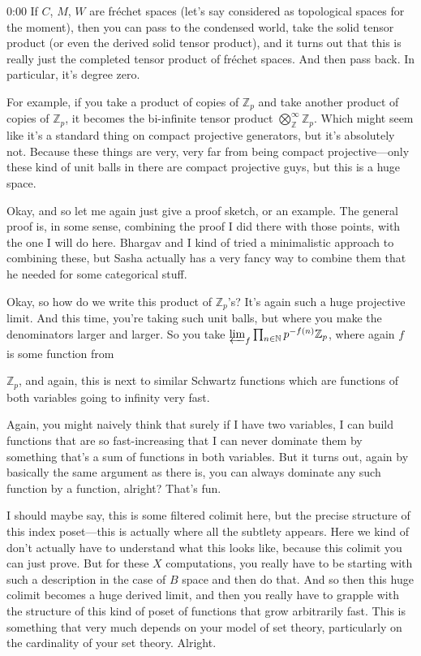\begin{unfinished}{0:00}
If $C$, $M$, $W$ are fréchet spaces (let's say considered as topological spaces for the moment), then you can pass to the condensed world, take the solid tensor product (or even the derived solid tensor product), and it turns out that this is really just the completed tensor product of fréchet spaces. And then pass back. In particular, it's degree zero.

For example, if you take a product of copies of $\mathbb{Z}_p$ and take another product of copies of $\mathbb{Z}_p$, it becomes the bi-infinite tensor product $\bigotimes_{\mathbb{Z}}^{\infty} \mathbb{Z}_p$. Which might seem like it's a standard thing on compact projective generators, but it's absolutely not. Because these things are very, very far from being compact projective---only these kind of unit balls in there are compact projective guys, but this is a huge space.

Okay, and so let me again just give a proof sketch, or an example. The general proof is, in some sense, combining the proof I did there with those points, with the one I will do here. Bhargav and I kind of tried a minimalistic approach to combining these, but Sasha actually has a very fancy way to combine them that he needed for some categorical stuff.

Okay, so how do we write this product of $\mathbb{Z}_p$'s? It's again such a huge projective limit. And this time, you're taking such unit balls, but where you make the denominators larger and larger. So you take $\varprojlim_f \prod_{n \in \mathbb{N}} p^{-f(n)} \mathbb{Z}_p$, where again $f$ is some function from 

$\mathbb{Z}_p$, and again, this is next to similar Schwartz functions which are functions of both variables going to infinity very fast.

Again, you might naively think that surely if I have two variables, I can build functions that are so fast-increasing that I can never dominate them by something that's a sum of functions in both variables. But it turns out, again by basically the same argument as there is, you can always dominate any such function by a function, alright? That's fun.

I should maybe say, this is some filtered colimit here, but the precise structure of this index poset---this is actually where all the subtlety appears. Here we kind of don't actually have to understand what this looks like, because this colimit you can just prove. But for these $X$ computations, you really have to be starting with such a description in the case of $B$ space and then do that. And so then this huge colimit becomes a huge derived limit, and then you really have to grapple with the structure of this kind of poset of functions that grow arbitrarily fast. This is something that very much depends on your model of set theory, particularly on the cardinality of your set theory. Alright.


\end{unfinished}
